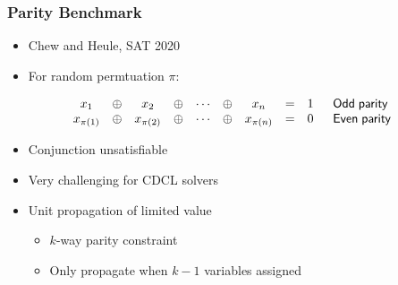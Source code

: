 \documentclass[t,pdf]{beamer}
\begin{document}
\begin{frame}

  \frametitle{Parity Benchmark}

\begin{itemize}
\item Chew and Heule, SAT 2020

\item For random permtuation $\pi$:
\end{itemize}
  \begin{displaymath}
    \begin{array}{cccccccccl}
    x_1 & \oplus & x_2 & \oplus & \cdots & \oplus & x_n & = & 1 & {\sf \;\; Odd \; parity}\\
    x_{\pi(1)} &  \oplus &  x_{\pi(2)} &  \oplus &  \cdots &  \oplus &  x_{\pi(n)} & = & 0& {\sf \;\; Even \; parity}\\
    \end{array}
  \end{displaymath}

  \begin{itemize}
    \item Conjunction unsatisfiable
    \item Very challenging for CDCL solvers
    \item Unit propagation of limited value
      \begin{itemize}
        \item $k$-way parity constraint
        \item Only propagate when $k-1$ variables assigned
      \end{itemize}
  \end{itemize}  

\end{frame}
\end{document}
